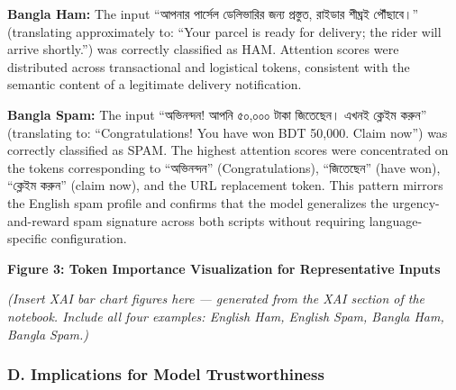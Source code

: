 \textbf{Bangla Ham:} The input ``আপনার পার্সেল ডেলিভারির জন্য প্রস্তুত,
রাইডার শীঘ্রই পৌঁছাবে।'' (translating approximately to: ``Your parcel is
ready for delivery; the rider will arrive shortly.'') was correctly
classified as HAM. Attention scores were distributed across
transactional and logistical tokens, consistent with the semantic
content of a legitimate delivery notification.

\textbf{Bangla Spam:} The input ``অভিনন্দন! আপনি ৫০,০০০ টাকা জিতেছেন।
এখনই ক্লেইম করুন'' (translating to: ``Congratulations! You have won BDT
50,000. Claim now'') was correctly classified as SPAM. The highest
attention scores were concentrated on the tokens corresponding to
``অভিনন্দন'' (Congratulations), ``জিতেছেন'' (have won), ``ক্লেইম করুন''
(claim now), and the URL replacement token. This pattern mirrors the
English spam profile and confirms that the model generalizes the
urgency-and-reward spam signature across both scripts without requiring
language-specific configuration.

\textbf{Figure 3: Token Importance Visualization for Representative
Inputs}

\emph{(Insert XAI bar chart figures here --- generated from the XAI
section of the notebook. Include all four examples: English Ham, English
Spam, Bangla Ham, Bangla Spam.)}

\subsubsection{D. Implications for Model
Trustworthiness}\label{d.-implications-for-model-trustworthiness}

